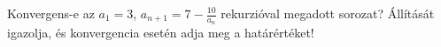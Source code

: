 \documentclass[11pt]{scrartcl}
\begin{document}
Konvergens-e az $a_1 = 3$, \(a_{n + 1} = 7 - \frac{10}{a_n}\) rekurzióval
megadott sorozat? Állítását igazolja, és konvergencia esetén adja meg a
határértéket!
\end{document}
